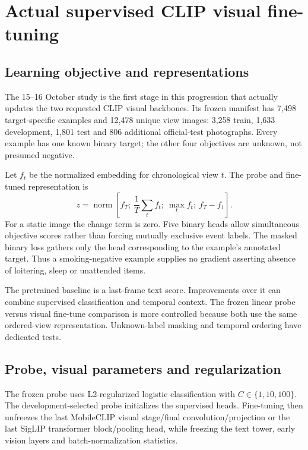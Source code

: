 \chapter{Actual supervised CLIP visual fine-tuning}
\label{ch:training}
\section{Learning objective and representations}
The 15--16 October study is the first stage in this progression that actually updates the two requested CLIP visual backbones. Its frozen manifest has 7,498 target-specific examples and 12,478 unique view images: 3,258 train, 1,633 development, 1,801 test and 806 additional official-test photographs. Every example has one known binary target; the other four objectives are unknown, not presumed negative.

Let $f_t$ be the normalized embedding for chronological view $t$. The probe and fine-tuned representation is
\begin{equation}
z=\operatorname{norm}\left[ f_T;\ \frac{1}{T}\sum_t f_t;\ \max_t f_t;\ f_T-f_1\right].
\end{equation}
For a static image the change term is zero. Five binary heads allow simultaneous objective scores rather than forcing mutually exclusive event labels. The masked binary loss gathers only the head corresponding to the example's annotated target. Thus a smoking-negative example supplies no gradient asserting absence of loitering, sleep or unattended items.

The pretrained baseline is a last-frame text score. Improvements over it can combine supervised classification and temporal context. The frozen linear probe versus visual fine-tune comparison is more controlled because both use the same ordered-view representation. Unknown-label masking and temporal ordering have dedicated tests.

\section{Probe, visual parameters and regularization}
The frozen probe uses L2-regularized logistic classification with $C\in\{1,10,100\}$. The development-selected probe initializes the supervised heads. Fine-tuning then unfreezes the last MobileCLIP visual stage/final convolution/projection or the last SigLIP transformer block/pooling head, while freezing the text tower, early vision layers and batch-normalization statistics.

